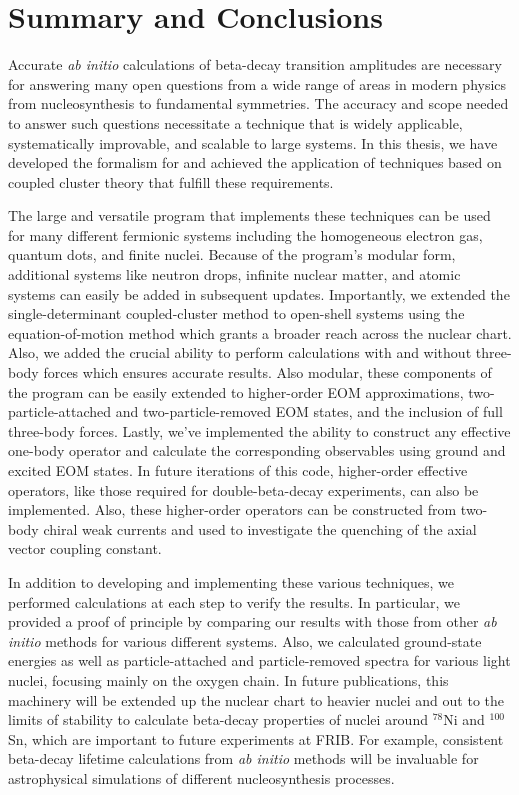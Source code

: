 \documentclass[../thesis.tex]{subfiles}
\begin{document}
\section{Summary and Conclusions}

Accurate \emph{ab initio} calculations of beta-decay transition amplitudes are necessary for answering many open questions from a wide range of areas in modern physics from nucleosynthesis to fundamental symmetries.  The accuracy and scope needed to answer such questions necessitate a technique that is widely applicable, systematically improvable, and scalable to large systems.  In this thesis, we have developed the formalism for and achieved the application of techniques based on coupled cluster theory that fulfill these requirements.

The large and versatile program that implements these techniques can be used for many different fermionic systems including the homogeneous electron gas, quantum dots, and finite nuclei.  Because of the program's modular form, additional systems like neutron drops, infinite nuclear matter, and atomic systems can easily be added in subsequent updates.  Importantly, we extended the single-determinant coupled-cluster method to open-shell systems using the equation-of-motion method which grants a broader reach across the nuclear chart.  Also, we added the crucial ability to perform calculations with and without three-body forces which ensures accurate results.  Also modular, these components of the program can be easily extended to higher-order EOM approximations, two-particle-attached and two-particle-removed EOM states, and the inclusion of full three-body forces.  Lastly, we've implemented the ability to construct any effective one-body operator and calculate the corresponding observables using ground and excited EOM states.  In future iterations of this code, higher-order effective operators, like those required for double-beta-decay experiments, can also be implemented.  Also, these higher-order operators can be constructed from two-body chiral weak currents and used to investigate the quenching of the axial vector coupling constant.

In addition to developing and implementing these various techniques, we performed calculations at each step to verify the results.  In particular, we provided a proof of principle by comparing our results with those from other \emph{ab initio} methods for various different systems.  Also, we calculated ground-state energies as well as particle-attached and particle-removed spectra for various light nuclei, focusing mainly on the oxygen chain.  In future publications, this machinery will be extended up the nuclear chart to heavier nuclei and out to the limits of stability to calculate beta-decay properties of nuclei around $^{78}$Ni and $^{100}$Sn, which are important to future experiments at FRIB.  For example, consistent beta-decay lifetime calculations from \emph{ab initio} methods will be invaluable for astrophysical simulations of different nucleosynthesis processes.
\end{document}
